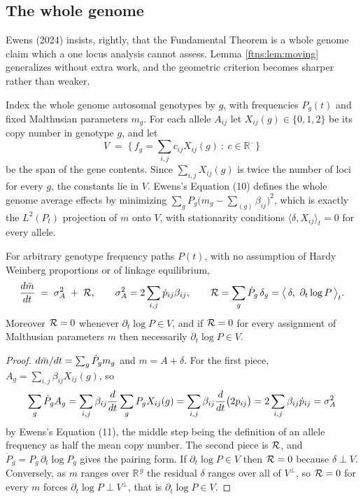 \subsection{The whole genome}
\label{ftns:sec:whole}

Ewens (2024) insists, rightly, that the Fundamental Theorem is a whole genome claim which a
one locus analysis cannot assess. Lemma \ref{ftns:lem:moving} generalizes without extra work, and the
geometric criterion becomes sharper rather than weaker.

Index the whole genome autosomal genotypes by $g$, with frequencies $P_g(t)$ and fixed Malthusian
parameters $m_g$. For each allele $A_{ij}$ let $X_{ij}(g)\in\{0,1,2\}$ be its copy number in
genotype $g$, and let
\[
V \;=\; \Big\{\, f_g=\textstyle\sum_{i,j}c_{ij}X_{ij}(g) \ :\ c\in\mathbb{R}^{\,\cdot}\,\Big\}
\]
be the span of the gene contents. Since $\sum_{i,j}X_{ij}(g)$ is twice the number of loci for every
$g$, the constants lie in $V$. Ewens's Equation (10) defines the whole genome average effects by
minimizing $\sum_gP_g\big(m_g-\sum_{(g)}\beta_{ij}\big)^2$, which is exactly the $L^2(P_t)$
projection of $m$ onto $V$, with stationarity conditions $\langle\delta,X_{ij}\rangle_t=0$ for
every allele.

\begin{theorem}
\label{ftns:thm:whole}
For arbitrary genotype frequency paths $P(t)$, with no assumption of Hardy Weinberg proportions
or of linkage equilibrium,
\begin{equation}
\frac{d\bar{m}}{dt} \;=\; \sigma^{2}_{A} \;+\; \mathcal{R},
\qquad
\sigma^{2}_{A}=2\sum_{i,j}\dot p_{ij}\beta_{ij},
\qquad
\mathcal{R}=\sum_g\dot P_g\,\delta_g=\big\langle\,\delta,\ \partial_t\log P\,\big\rangle_t .
\label{ftns:eq:whole}
\end{equation}
Moreover $\mathcal{R}=0$ whenever $\partial_t\log P\in V$, and if $\mathcal{R}=0$ for every assignment of Malthusian
parameters $m$ then necessarily $\partial_t\log P\in V$.
\end{theorem}

\begin{proof}
$d\bar{m}/dt=\sum_g\dot P_gm_g$ and $m=A+\delta$. For the first piece,
$A_g=\sum_{i,j}\beta_{ij}X_{ij}(g)$, so
\[
\sum_g\dot P_gA_g=\sum_{i,j}\beta_{ij}\frac{d}{dt}\sum_gP_gX_{ij}(g)
=\sum_{i,j}\beta_{ij}\frac{d}{dt}\big(2p_{ij}\big)=2\sum_{i,j}\beta_{ij}\dot p_{ij}=\sigma^{2}_{A}
\]
by Ewens's Equation (11), the middle step being the definition of an allele frequency as half the
mean copy number. The second piece is $\mathcal{R}$, and $\dot P_g=P_g\,\partial_t\log P_g$ gives the
pairing form. If $\partial_t\log P\in V$ then $\mathcal{R}=0$ because $\delta\perp V$. Conversely, as $m$
ranges over $\mathbb{R}^{\,g}$ the residual $\delta$ ranges over all of $V^\perp$, so $\mathcal{R}=0$ for
every $m$ forces $\partial_t\log P\perp V^\perp$, that is $\partial_t\log P\in V$.
\end{proof}

